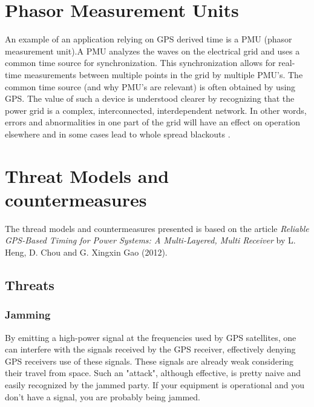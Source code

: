 \documentclass[12pt,english,a4paper]{article}
\begin{document}
\section{Phasor Measurement Units}
An example of an application relying on GPS derived time is a PMU (phasor measurement unit).A PMU analyzes the waves on the electrical grid and uses a common time source for synchronization. This synchronization allows for real-time measurements between multiple points in the grid by multiple PMU's. The common time source (and why PMU's are relevant) is often obtained by using GPS. \cite{YLJRNR} The value of such a device is understood clearer by recognizing that the power grid is a complex, interconnected, interdependent network. In other words, errors and abnormalities in one part of the grid will have an effect on operation elsewhere and in some cases lead to whole spread blackouts \cite{EVPMUGA}.

\section{Threat Models and countermeasures}
The thread models and countermeasures presented is based on the article \textit{Reliable GPS-Based Timing for Power Systems: A Multi-Layered, Multi Receiver} by L. Heng, D. Chou and G. Xingxin Gao (2012). 
\subsection{Threats}
\subsubsection{Jamming}\label{jam}
By emitting a high-power signal at the frequencies used by GPS satellites, one can interfere with the signals received by the GPS receiver, effectively denying GPS receivers use of these signals. These signals are already weak considering their travel from space. Such an "attack", although effective, is pretty naive and easily recognized by the jammed party. If your equipment is operational and you don't have a signal, you are probably being jammed.
\end{document}
